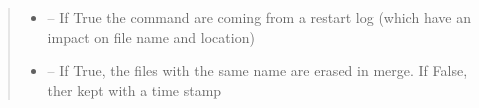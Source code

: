 \documentclass[letterpaper,10pt,english]{sphinxmanual}
\begin{document}
\begin{fulllineitems}
\begin{quote}
\begin{description}
\begin{itemize}
\item {} 
 -- If True the command are coming from a restart log (which have an impact on file name and
location)

\item {} 
 -- If True, the files with the same name are erased in merge. If False, ther kept with a time stamp

\end{itemize}

\end{description}\end{quote}

\end{fulllineitems}

\end{document}
